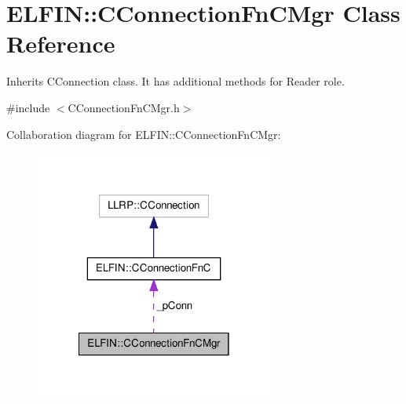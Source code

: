 \hypertarget{class_e_l_f_i_n_1_1_c_connection_fn_c_mgr}{\section{E\-L\-F\-I\-N\-:\-:C\-Connection\-Fn\-C\-Mgr Class Reference}
\label{class_e_l_f_i_n_1_1_c_connection_fn_c_mgr}
}


Inherits C\-Connection class. It has additional methods for Reader role.  




{\ttfamily \#include $<$C\-Connection\-Fn\-C\-Mgr.\-h$>$}



Collaboration diagram for E\-L\-F\-I\-N\-:\-:C\-Connection\-Fn\-C\-Mgr\-:
\nopagebreak
\begin{figure}[H]
\begin{center}
\leavevmode
\includegraphics[width=222pt]{class_e_l_f_i_n_1_1_c_connection_fn_c_mgr__coll__graph}
\end{center}
\end{figure}
